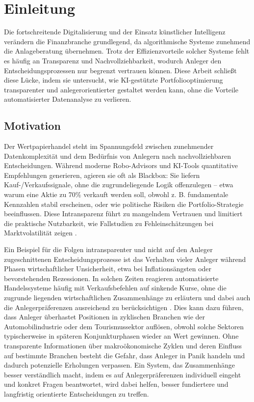 \chapter{Einleitung}

Die fortschreitende Digitalisierung und der Einsatz künstlicher Intelligenz verändern die Finanzbranche grundlegend, da algorithmische Systeme zunehmend die Anlageberatung übernehmen.
Trotz der Effizienzvorteile solcher Systeme fehlt es häufig an Transparenz und Nachvollziehbarkeit, wodurch Anleger den Entscheidungsprozessen nur begrenzt vertrauen können.
Diese Arbeit schließt diese Lücke, indem sie untersucht, wie \acs{KI}-gestützte Portfoliooptimierung transparenter und anlegerorientierter gestaltet werden kann, ohne die Vorteile automatisierter Datenanalyse zu verlieren.

\section{Motivation}

Der Wertpapierhandel steht im Spannungsfeld zwischen zunehmender Datenkomplexität und dem Bedürfnis von Anlegern nach nachvollziehbaren Entscheidungen.
Während moderne Robo-Advisors und \acs{KI}-Tools quantitative Empfehlungen generieren, agieren sie oft als Blackbox:
Sie liefern Kauf-/Verkaufssignale, ohne die zugrundeliegende Logik offenzulegen – etwa warum eine Aktie zu 70\% verkauft werden soll, obwohl z. B. fundamentale Kennzahlen stabil erscheinen, oder wie politische Risiken die Portfolio-Strategie beeinflussen.
Diese Intransparenz führt zu mangelndem Vertrauen und limitiert die praktische Nutzbarkeit, wie Fallstudien zu Fehleinschätzungen bei Marktvolatilität zeigen \autocite[S. 19 und 20]{CFAInstitute2020Trust}.


Ein Beispiel für die Folgen intransparenter und nicht auf den Anleger zugeschnittenen Entscheidungsprozesse ist das Verhalten vieler Anleger während Phasen wirtschaftlicher Unsicherheit, etwa bei Inflationsängsten oder bevorstehenden Rezessionen.
In solchen Zeiten reagieren automatisierte Handelssysteme häufig mit Verkaufsbefehlen auf sinkende Kurse, ohne die zugrunde liegenden wirtschaftlichen Zusammenhänge zu erläutern und dabei auch die Anlegerpräferenzen ausreichend zu berücksichtigen \autocite[S. 25-32]{schnorpfeil2025inflation}.
Dies kann dazu führen, dass Anleger überhastet Positionen in zyklischen Branchen wie der Automobilindustrie oder dem Tourismussektor auflösen, obwohl solche Sektoren typischerweise in späteren Konjunkturphasen wieder an Wert gewinnen.
Ohne transparente Informationen über makroökonomische Zyklen und deren Einfluss auf bestimmte Branchen besteht die Gefahr, dass Anleger in Panik handeln und dadurch potenzielle Erholungen verpassen.
Ein System, das Zusammenhänge besser verständlich macht, indem es auf Anlegerpräferenzen individuell eingeht und konkret Fragen beantwortet, wird dabei helfen, besser fundiertere und langfristig orientierte Entscheidungen zu treffen.

